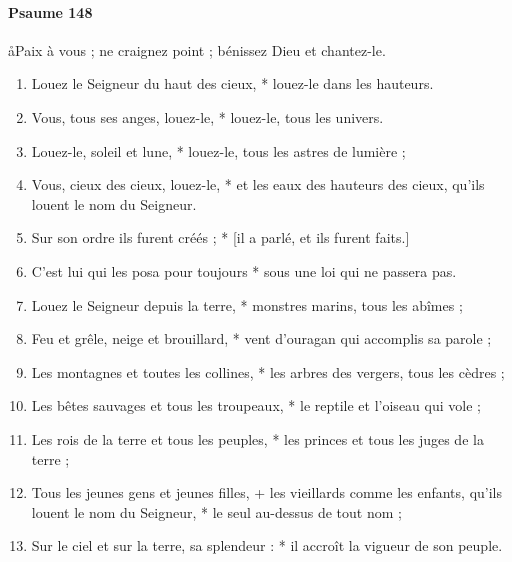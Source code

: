 \documentclass[twoside]{article}
\begin{document}
\begin{paracol}[1]{2}
\switchcolumn

\paragraph{Psaume 148}
\aa Paix à vous ; ne craignez point ; bénissez Dieu et chantez-le.


\begin{enumerate}[wide, itemsep=0mm, labelwidth=!, labelindent=0pt, label=\color{gregoriocolor}\theenumi]
\item Louez le Seigneur du haut des cieux, *
louez-le dans les hauteurs.

\item Vous, tous ses anges, louez-le, *
louez-le, tous les univers.

\item Louez-le, soleil et lune, *
louez-le, tous les astres de lumière ;

\item Vous, cieux des cieux, louez-le, *
et les eaux des hauteurs des cieux, qu’ils louent le nom du Seigneur.

\item Sur son ordre ils furent créés ; * [il a parlé, et ils furent faits.]

\item C’est lui qui les posa pour toujours *
sous une loi qui ne passera pas.

\item Louez le Seigneur depuis la terre, *
monstres marins, tous les abîmes ;

\item Feu et grêle, neige et brouillard, *
vent d’ouragan qui accomplis sa parole ;

\item Les montagnes et toutes les collines, *
les arbres des vergers, tous les cèdres ;

\item Les bêtes sauvages et tous les troupeaux, *
le reptile et l’oiseau qui vole ;

\item Les rois de la terre et tous les peuples, *
les princes et tous les juges de la terre ;

\item Tous les jeunes gens et jeunes filles, +
les vieillards comme les enfants, qu’ils louent le nom du Seigneur, *
le seul au-dessus de tout nom ;

\item Sur le ciel et sur la terre, sa splendeur : *
il accroît la vigueur de son peuple.


\end{enumerate}
\end{paracol}
\end{document}
